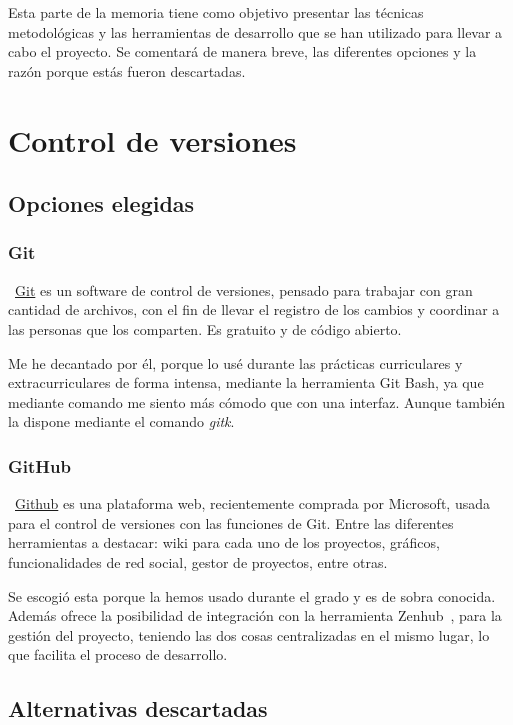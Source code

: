 
Esta parte de la memoria tiene como objetivo presentar las técnicas metodológicas y las herramientas de desarrollo que se han utilizado para llevar a cabo el proyecto. Se comentará de manera breve, las diferentes opciones y la razón porque estás fueron descartadas.
 
\section{Control de versiones}

\subsection{Opciones elegidas}

\subsubsection{Git}
~\href{https://git-scm.com//}{Git} es un software de control de versiones, pensado para trabajar con gran cantidad de archivos, con el fin de llevar el registro de los cambios y coordinar a las personas que los comparten. Es gratuito y de código abierto.

Me he decantado por él, porque lo usé durante las prácticas curriculares y extracurriculares de forma intensa, mediante la herramienta Git Bash, ya que mediante comando me siento más cómodo que con una interfaz. Aunque también la dispone mediante el comando \emph{gitk}.

\subsubsection{GitHub}\label{github}
~\href{https://github.com/}{Github} es una plataforma web, recientemente comprada por Microsoft, usada para el control de versiones con las funciones de Git. Entre las diferentes herramientas a destacar: wiki para cada uno de los proyectos, gráficos, funcionalidades de red social, gestor de proyectos, entre otras.

Se escogió esta porque la hemos usado durante el grado y es de sobra conocida. Además ofrece la posibilidad de integración con la herramienta Zenhub~\pageref{zenhub}, para la gestión del proyecto, teniendo las dos cosas centralizadas en el mismo lugar, lo que facilita el proceso de desarrollo.

\subsection{Alternativas descartadas}

